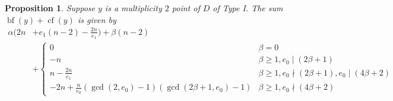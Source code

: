 \documentclass[12pt]{amsart}
\numberwithin{equation}{section}
\newtheorem{prop}[equation]{Proposition}
\theoremstyle{definition}
\DeclareMathOperator{\blf}{bf}
\DeclareMathOperator{\cf}{cf}
\begin{document}
\begin{prop}\label{prop: cdc for type I}
    Suppose $y$ is a multiplicity $2$ point of $D$ of Type I. The sum $\blf(y)+\cf(y)$ is given by
    \begin{align*}
        \alpha(2n&+e_1(n-2)-\frac{2n}{e_1})+\beta(n-2)\\
        &+ \begin{cases}
    0&\beta=0\\
    -n&\beta\geq1,e_0\mid (2\beta+1)\\
    n-\frac{2n}{e_1}&\beta\geq1,e_0\nmid (2\beta+1),e_0\mid (4\beta+2)\\
    -2n+\frac{n}{e_0}(\gcd(2,e_0)-1)(\gcd(2\beta+1,e_0)-1)&\beta\geq1,e_0\nmid (4\beta+2)\end{cases}
    \end{align*}
\end{prop}
\end{document}
